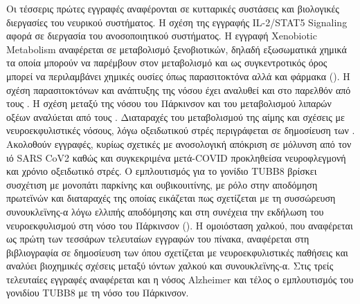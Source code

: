 \documentclass[12pt]{report}
\begin{document}
        Οι τέσσερις πρώτες εγγραφές αναφέρονται σε κυτταρικές συστάσεις και βιολογικές διεργασίες του νευρικού συστήματος. Η σχέση της εγγραφής IL-2/STAT5 Signaling αφορά σε διεργασία του ανοσοποιητικού συστήματος. Η εγγραφή Xenobiotic Metabolism αναφέρεται σε μεταβολισμό ξενοβιοτικών, δηλαδή εξωσωματικά χημικά τα οποία μπορούν να παρέμβουν στον μεταβολισμό και ως συγκεντροτικός όρος μπορεί να περιλαμβάνει χημικές ουσίες όπως παρασιτοκτόνα αλλά και φάρμακα (\emph{\cite{Croom2012MetabolismEnvironments}}). Η σχέση παρασιτοκτόνων και ανάπτυξης της νόσου έχει αναλυθεί και στο παρελθόν από τους \cite{LeCouteur1999PesticidesDisease}. Η σχέση μεταξύ της νόσου του Πάρκινσον και του μεταβολισμού λιπαρών οξέων αναλύεται από τους \cite{Alecu2019DysregulatedDisease}. Διαταραχές του μεταβολισμού της αίμης και σχέσεις με νευροεκφυλιστικές νόσους, λόγω οξειδωτικού στρές περιγράφεται σε δημοσίευση των \cite{Chiabrando2018UnravelingNeurodegeneration}. Ακολοθούν εγγραφές, κυρίως σχετικές με ανοσολογική απόκριση σε μόλυνση από τον ιό SARS CoV2 καθώς και συγκεκριμένα μετά-COVID προκληθείσα νευροφλεγμονή και χρόνιο οξειδωτικό στρές. Ο εμπλουτισμός για το γονίδιο TUBB8 βρίσκει συσχέτιση με μονοπάτι παρκίνης και ουβικουιτίνης, με ρόλο στην αποδόμηση πρωτεϊνών και διαταραχές της οποίας εικάζεται πως σχετίζεται με τη συσσώρευση  συνουκλεϊνης-α λόγω ελλιπής αποδόμησης και στη συνέχεια την εκδήλωση του νευροεκφυλισμού στη νόσο του Πάρκινσον (\emph{\cite{Zhao2024ExploringDisease}}). Η ομοιόσταση χαλκού, που αναφέρεται ως πρώτη των τεσσάρων τελευταίων εγγραφών του πίνακα, αναφέρεται στη βιβλιογραφία σε δημοσίευση των \cite{Gaggelli2006CopperSclerosis} όπου σχετίζεται με νευροεκφυλιστικές παθήσεις και αναλύει βιοχημικές σχέσεις μεταξύ ιόντων χαλκού και συνουκλεϊνης-α. Στις τρείς τελευταίες εγγραφές αναφέρεται και η νόσος Alzheimer και τέλος ο εμπλουτισμός του γονιδίου TUBB8 με τη νόσο του Πάρκινσον.
\end{document}
